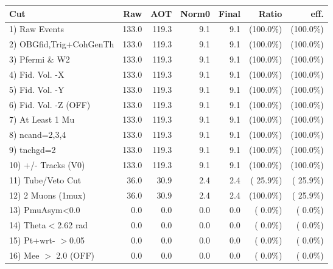  \begin{table}[h!]\centering
 \begin{tabular}{||l||r|r|r|r|r|r||}
 \hline
 \hline
 Cut & Raw & AOT & Norm0 & Final & Ratio & eff.       \\
 \hline
  1) Raw Events           &        133.0 &        119.3 &          9.1 &          9.1 & (100.0\%) & (100.0\%) \\
  2) OBGfid,Trig+CohGenTh &        133.0 &        119.3 &          9.1 &          9.1 & (100.0\%) & (100.0\%) \\
  3) Pfermi \& W2         &        133.0 &        119.3 &          9.1 &          9.1 & (100.0\%) & (100.0\%) \\
  4) Fid. Vol. -X         &        133.0 &        119.3 &          9.1 &          9.1 & (100.0\%) & (100.0\%) \\
  5) Fid. Vol. -Y         &        133.0 &        119.3 &          9.1 &          9.1 & (100.0\%) & (100.0\%) \\
  6) Fid. Vol. -Z (OFF)   &        133.0 &        119.3 &          9.1 &          9.1 & (100.0\%) & (100.0\%) \\
  7) At Least 1 Mu        &        133.0 &        119.3 &          9.1 &          9.1 & (100.0\%) & (100.0\%) \\
  8) ncand=2,3,4          &        133.0 &        119.3 &          9.1 &          9.1 & (100.0\%) & (100.0\%) \\
  9) tnchgd=2             &        133.0 &        119.3 &          9.1 &          9.1 & (100.0\%) & (100.0\%) \\
 10) +/- Tracks (V0)      &        133.0 &        119.3 &          9.1 &          9.1 & (100.0\%) & (100.0\%) \\
 11) Tube/Veto Cut        &         36.0 &         30.9 &          2.4 &          2.4 & ( 25.9\%) & ( 25.9\%) \\
 12) 2 Muons (1mux)       &         36.0 &         30.9 &          2.4 &          2.4 & (100.0\%) & ( 25.9\%) \\
 13) PmuAsym<0.0          &          0.0 &          0.0 &          0.0 &          0.0 & (  0.0\%) & (  0.0\%) \\
 14) Theta$<$2.62 rad     &          0.0 &          0.0 &          0.0 &          0.0 & (  0.0\%) & (  0.0\%) \\
 15) Pt+wrt- $>$0.05      &          0.0 &          0.0 &          0.0 &          0.0 & (  0.0\%) & (  0.0\%) \\
 16) Mee $>$ 2.0  (OFF)   &          0.0 &          0.0 &          0.0 &          0.0 & (  0.0\%) & (  0.0\%) \\

\end{tabular}
\end{table}
